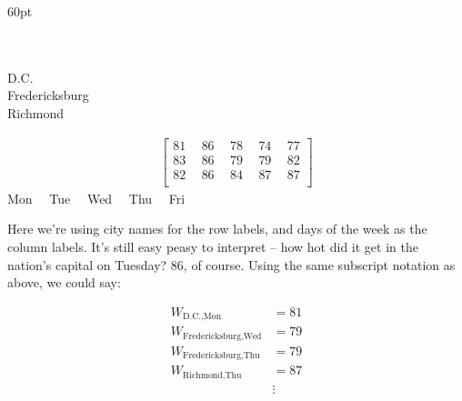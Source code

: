 \vspace{-.4in} 
\begin{adjustwidth}{}{60pt}
\begin{center}
\begin{multicols}{2}
\begin{flushright}
\hspace*{1cm} \\
\hspace*{1cm} \\
\footnotesize{D.C.} \\
\footnotesize{Fredericksburg} \\
\footnotesize{Richmond} \\
\end{flushright}
\columnbreak
\vspace{-1.5in} 
\begin{align*}
\begin{bmatrix}
81 \ & \ 86 \ & \ 78 \ & \ 74 \ & \ 77 \\
83 \ & \ 86 \ & \ 79 \ & \ 79 \ & \ 82 \\
82 \ & \ 86 \ & \ 84 \ & \ 87 \ & \ 87 \\
\end{bmatrix}
\end{align*}
\vspace{-.15in}
\scriptsize{Mon} \ \  \scriptsize{Tue} \ \ \scriptsize{Wed} \ \ \scriptsize{Thu} \ \ \scriptsize{Fri} \\
\end{multicols}
\end{center}
\end{adjustwidth}
\vspace{-.15in}

Here we're using city names for the row labels, and days of the week as the
column labels. It's still easy peasy to interpret -- how hot did it get in the
nation's capital on Tuesday? 86\textdegree, of course. Using the same subscript
notation as above, we could say:

\vspace{-.15in}
\begin{align*}
W_{\textrm{D.C.},\textrm{Mon}} &= 81 \\
W_{\textrm{Fredericksburg},\textrm{Wed}} &= 79 \\
W_{\textrm{Fredericksburg},\textrm{Thu}} &= 79 \\
W_{\textrm{Richmond},\textrm{Thu}} &= 87 \\
&\vdots \\
\end{align*}

